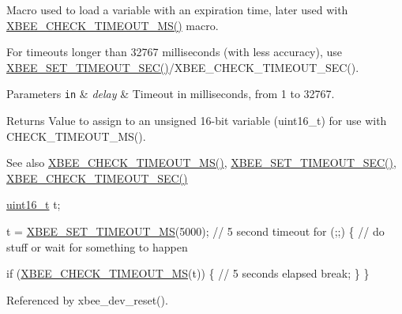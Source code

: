 Macro used to load a variable with an expiration time, later used with \hyperlink{group__hal_gac3485c3c34a50a5a35d553cc743d163e}{X\+B\+E\+E\+\_\+\+C\+H\+E\+C\+K\+\_\+\+T\+I\+M\+E\+O\+U\+T\+\_\+\+M\+S()} macro. 

For timeouts longer than 32767 milliseconds (with less accuracy), use \hyperlink{group__hal_ga6adb5c9e19c84a261c569ff4d77d1170}{X\+B\+E\+E\+\_\+\+S\+E\+T\+\_\+\+T\+I\+M\+E\+O\+U\+T\+\_\+\+S\+E\+C()}/\+X\+B\+E\+E\+\_\+\+C\+H\+E\+C\+K\+\_\+\+T\+I\+M\+E\+O\+U\+T\+\_\+\+S\+EC().


\begin{DoxyParams}[1]{Parameters}
\mbox{\tt in}  & {\em delay} & Timeout in milliseconds, from 1 to 32767.\\
\hline
\end{DoxyParams}
\begin{DoxyReturn}{Returns}
Value to assign to an unsigned 16-\/bit variable (uint16\+\_\+t) for use with C\+H\+E\+C\+K\+\_\+\+T\+I\+M\+E\+O\+U\+T\+\_\+\+M\+S().
\end{DoxyReturn}
\begin{DoxySeeAlso}{See also}
\hyperlink{group__hal_gac3485c3c34a50a5a35d553cc743d163e}{X\+B\+E\+E\+\_\+\+C\+H\+E\+C\+K\+\_\+\+T\+I\+M\+E\+O\+U\+T\+\_\+\+M\+S()}, \hyperlink{group__hal_ga6adb5c9e19c84a261c569ff4d77d1170}{X\+B\+E\+E\+\_\+\+S\+E\+T\+\_\+\+T\+I\+M\+E\+O\+U\+T\+\_\+\+S\+E\+C()}, \hyperlink{group__hal_ga858c3c1caa899efd6af9ee8a0fe09246}{X\+B\+E\+E\+\_\+\+C\+H\+E\+C\+K\+\_\+\+T\+I\+M\+E\+O\+U\+T\+\_\+\+S\+E\+C()}
\end{DoxySeeAlso}

\begin{DoxyCode}
\hyperlink{group__hal__dos_ga5a8b2dc9e45a9ee81a94ef304fb62505}{uint16\_t} t;

t = \hyperlink{group__hal_ga848a9903fa7859d84cb22aeddde4c42f}{XBEE\_SET\_TIMEOUT\_MS}(5000);      \textcolor{comment}{// 5 second timeout}
\textcolor{keywordflow}{for} (;;)
\{
   \textcolor{comment}{// do stuff or wait for something to happen}

   \textcolor{keywordflow}{if} (\hyperlink{group__hal_gac3485c3c34a50a5a35d553cc743d163e}{XBEE\_CHECK\_TIMEOUT\_MS}(t))
   \{
      \textcolor{comment}{// 5 seconds elapsed}
      \textcolor{keywordflow}{break};
   \}
\}
\end{DoxyCode}
 

Referenced by xbee\+\_\+dev\+\_\+reset().

\mbox{\label{group__hal_ga6adb5c9e19c84a261c569ff4d77d1170}} 
